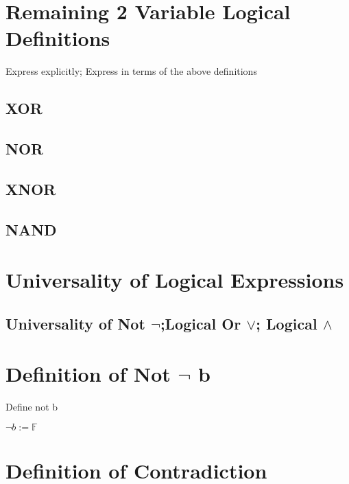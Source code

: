 \documentclass[11pt]{article}
\begin{document}
\section{Remaining 2 Variable Logical Definitions}
Express explicitly; Express in terms of the above definitions
\subsection{XOR}
\subsection{NOR}
\subsection{XNOR}
\subsection{NAND}






\section{Universality of Logical Expressions}
\subsection{Universality of Not $\lnot$;\hspace{2mm}Logical Or $\lor$;\hspace{2mm} Logical $\land$}







\section{Definition of Not $\lnot$ b}
Define not b
\begin{center}
\vspace{2mm}
$
\lnot b := \mathbb{F}
$
\end{center}






\section{Definition of Contradiction}
\end{document}
